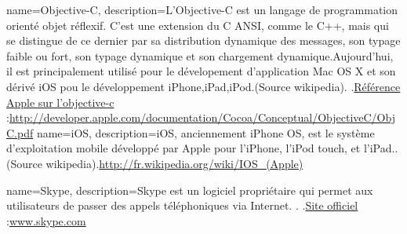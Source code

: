



{name={Objective-C},
description={L'Objective-C est un langage de programmation orienté objet réflexif. C'est une extension du C ANSI, comme le C++, mais qui se distingue de ce dernier par sa distribution dynamique des messages, son typage faible ou fort, son typage dynamique et son chargement dynamique.Aujourd'hui, il est principalement utilisé pour le dévelopement d'application  Mac OS X et son dérivé iOS pou le développement iPhone,iPad,iPod.(Source wikipedia).  .\href{http://developer.apple.com/documentation/Cocoa/Conceptual/ObjectiveC/ObjC.pdf}{Référence Apple sur l'objective-c} :\url{http://developer.apple.com/documentation/Cocoa/Conceptual/ObjectiveC/ObjC.pdf}
}
}
{name={iOS},
description={iOS, anciennement iPhone OS, est le système d'exploitation mobile développé par Apple pour l'iPhone, l'iPod touch, et l'iPad..(Source wikipedia).\url{http://fr.wikipedia.org/wiki/IOS\_(Apple)}
}
}

{name={Skype},
description={Skype est un logiciel propriétaire qui permet aux utilisateurs de passer des appels téléphoniques via Internet. .   .\href{http://www.skype.com}{Site officiel} :\url{www.skype.com}
}
}

